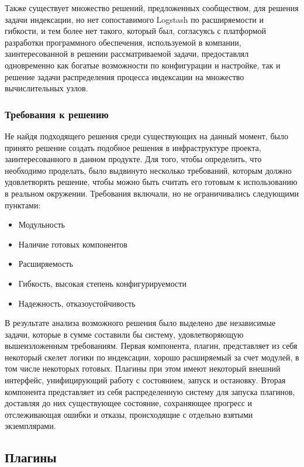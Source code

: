 Также существует множество решений, предложенных сообществом, для решения задачи индексации, но нет сопоставимого Logstash по расширяемости и гибкости, и тем более нет такого, который был, согласуясь с платформой разработки программного обеспечения, используемой в компании, заинтересованной в решении рассматриваемой задачи, предоставлял одновременно как богатые возможности по конфигурации и настройке, так и решение задачи распределения процесса индексации на множество вычислительных узлов.

\subsubsection{Требования к решению}

Не найдя подходящего решения среди существующих на данный момент, было принято решение создать подобное решения в инфраструктуре проекта, заинтересованного в данном продукте. Для того, чтобы определить, что необходимо проделать, было выдвинуто несколько требований, которым должно удовлетворять решение, чтобы можно быть считать его готовым к использованию в реальном окружении. Требования включали, но не ограничивались следующими пунктами:

\begin{itemize}
	\item Модульность
	\item Наличие готовых компонентов
	\item Расширяемость
	\item Гибкость, высокая степень конфигурируемости
	\item Надежность, отказоустойчивость
\end{itemize}

В результате анализа возможного решения было выделено две независимые задачи, которые в сумме составили бы систему, удовлетворяющую вышеизложенным требованиям. Первая компонента, плагин, представляет из себя некоторый скелет логики по индексации, хорошо расширяемый за счет модулей, в том числе некоторых готовых. Плагины при этом имеют некоторый внешний интерфейс, унифицирующий работу с состоянием, запуск и остановку. Вторая компонента представляет из себя распределенную систему для запуска плагинов, доставляя до них существующее состояние, сохраняющее прогресс и отслеживающая ошибки и отказы, происходящие с отдельно взятыми экземплярами.

\subsection{Плагины}

